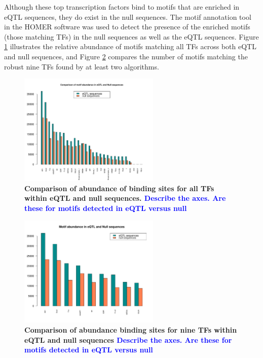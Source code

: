 \documentclass[12pt]{article}
\begin{document}
Although these top transcription factors bind to motifs that are enriched in eQTL sequences, they do exist in the null sequences. The motif annotation tool in the HOMER software was used to detect the presence of the enriched motifs (those matching TFs) in the null sequences as well as the eQTL sequences. Figure \ref{allMotifComparison} illustrates the relative abundance of motifs matching all TFs across both eQTL and null sequences, and Figure \ref{top9Comparison} compares the number of motifs matching the robust nine TFs found by at least two algorithms.

\begin{figure}[!htbp]
\centering
\includegraphics[width= 0.6\textwidth]{AllMotifComparison.pdf} 
\caption{\bf{Comparison of abundance of binding sites for all TFs within eQTL and null sequences.}  \textcolor{blue}{Describe the axes. Are these for motifs detected in eQTL versus null}}
\label{allMotifComparison}
\end{figure}

\begin{figure}[!htbp]
\centering
\includegraphics[width= 0.6\textwidth]{Top9TFsComparison.pdf} 
\caption{\bf{Comparison of abundance binding sites for nine TFs within eQTL and null sequences} \textcolor{blue}{Describe the axes. Are these for motifs detected in eQTL versus null}}
\label{top9Comparison}
\end{figure}
\end{document}
